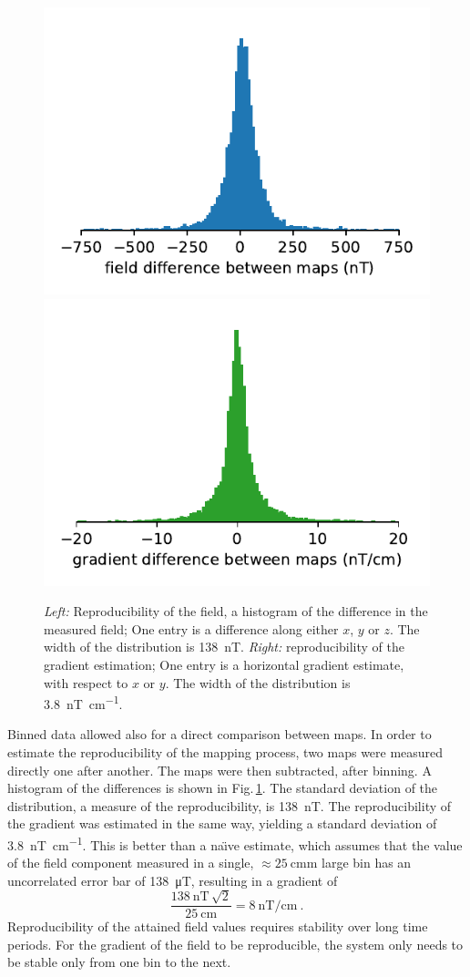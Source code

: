 \begin{figure}
  \centering
  \includegraphics[width=0.49\linewidth]{gfx/mapping/lpsc/reproducibility_field.pdf}
  \includegraphics[width=0.49\linewidth]{gfx/mapping/lpsc/reproducibility_gradient.pdf}
  \caption{\emph{Left:} Reproducibility of the field, a histogram of the difference in the measured field;
  One entry is a difference along either $x$, $y$ or $z$.
  The width of the distribution is \SI{138}{\nano\tesla}.
  \emph{Right:} reproducibility of the gradient estimation;
  One entry is a horizontal gradient estimate, with respect to $x$ or $y$.
  The width of the distribution is \SI[per-mode=symbol]{3.8}{\nano\tesla\per\centi\metre}.}\label{fig:mapping_bastille_reproducibility}
\end{figure}

Binned data allowed also for a direct comparison between maps.
In order to estimate the reproducibility of the mapping process, two maps were measured directly one after another.
The maps were then subtracted, after binning.
A histogram of the differences is shown in Fig.\,\ref{fig:mapping_bastille_reproducibility}.
The standard deviation of the distribution, a measure of the reproducibility, is \SI{138}{\nano\tesla}.
The reproducibility of the gradient was estimated in the same way, yielding a standard deviation of \SI[per-mode=symbol]{3.8}{\nano\tesla\per\centi\metre}.
This is better than a na\"{\i}ve estimate, which assumes that the value of the field component measured in a single,
$\approx \SI{25}{\centi\metre}$m large bin has an uncorrelated error bar of \SI{138}{\micro\tesla}, resulting in a gradient of
\begin{equation}
  \frac{\SI{138}{\nano\tesla} \, \sqrt{2}}{\SI{25}{\centi\meter}} = \SI[per-mode=symbol]{8}{\nano\tesla\per\centi\meter} \ .
\end{equation}
Reproducibility of the attained field values requires stability over long time periods.
For the gradient of the field to be reproducible, the system only needs to be stable only from one bin to the next.

